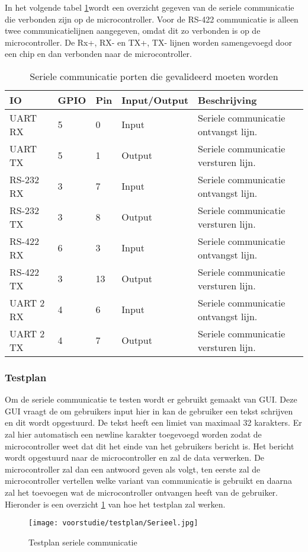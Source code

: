 \noindent In het volgende tabel \ref{tab:hw_val_serieel}wordt een overzicht gegeven van de seriele communicatie die verbonden zijn op de microcontroller. Voor de RS-422 communicatie is alleen twee communicatielijnen aangegeven, omdat dit zo verbonden is op de microcontroller. De Rx+, RX- en TX+, TX- lijnen worden samengevoegd door een chip en dan verbonden naar de microcontroller.
\begin{table}[h!]
	\caption{Seriele communicatie porten die gevalideerd moeten worden}
	\begin{tabular}{llllp{9cm}}
	\toprule
	\textbf{IO} & \textbf{GPIO} & \textbf{Pin} & \textbf{Input/Output} & \textbf{Beschrijving}	\\ \toprule
	UART RX		& 5			& 0    	& Input		& Seriele communicatie ontvangst lijn.			\\
	UART TX		& 5			& 1    	& Output	& Seriele communicatie versturen lijn.			\\
	RS-232 RX	& 3			& 7    	& Input		& Seriele communicatie ontvangst lijn.			\\
	RS-232 TX	& 3			& 8    	& Output	& Seriele communicatie versturen lijn.			\\
	RS-422 RX	& 6			& 3    	& Input		& Seriele communicatie ontvangst lijn.			\\
	RS-422 TX	& 3			& 13   	& Output	& Seriele communicatie versturen lijn.			\\
	UART 2 RX	& 4			& 6    	& Input		& Seriele communicatie ontvangst lijn.			\\
	UART 2 TX	& 4			& 7   	& Output	& Seriele communicatie versturen lijn.			\\ \bottomrule
	\end{tabular}
	\label{tab:hw_val_serieel}
\end{table}

\subsubsection{Testplan}
Om de seriele communicatie te testen wordt er gebruikt gemaakt van GUI. Deze GUI vraagt de om gebruikers input hier in kan de gebruiker een tekst schrijven en dit wordt opgestuurd. De tekst heeft een limiet van maximaal 32 karakters. Er zal hier automatisch een newline karakter toegevoegd worden zodat de microcontroller weet dat dit het einde van het gebruikers bericht is. Het bericht wordt opgestuurd naar de microcontroller en zal de data verwerken. De microcontroller zal dan een antwoord geven als volgt, ten eerste zal de microcontroller vertellen welke variant van communicatie is gebruikt en daarna zal het toevoegen wat de microcontroller ontvangen heeft van de gebruiker. Hieronder is een overzicht \ref{fig:testplanserieel} van hoe het testplan zal werken.

\begin{figure}[h!]
	\caption{Testplan seriele communicatie}
	\label{fig:testplanserieel}
	\texttt{[image: voorstudie/testplan/Serieel.jpg]}
\end{figure}

